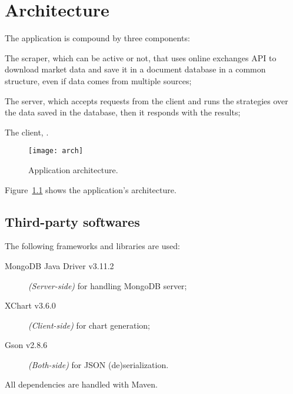 \chapter{Architecture}\label{ch:arch}

The application is compound by three components:
\begin{enumerate*}[label=(\roman*)]
	\item The scraper, which can be active or not, that uses online
		exchanges API to download market data and save it in a document
		database in a common structure, even if data comes from multiple
		sources;
	\item The server, which accepts requests from the client and runs the
		strategies over the data saved in the database, then it responds
		with the results;
	\item The client, .
\end{enumerate*}

\begin{figure}[p]
	\texttt{[image: arch]}
	\caption{Application architecture.}
	\label{fig:arch}
\end{figure}

Figure~\ref{fig:arch} shows the application's architecture.

\section{Third-party softwares}\label{sec:thirdparty}

The following frameworks and libraries are used:
\begin{description}
	\item[MongoDB Java Driver v3.11.2] \textit{(Server-side)} for handling
		MongoDB server;
	\item[XChart v3.6.0] \textit{(Client-side)} for chart generation;
	\item[Gson v2.8.6] \textit{(Both-side)} for JSON (de)serialization.
\end{description}

All dependencies are handled with Maven.
